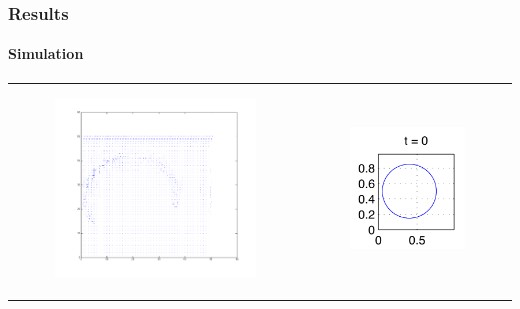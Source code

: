\documentclass[ucs]{beamer}
\begin{document}
\begin{frame}
\frametitle{Results}
\framesubtitle{Simulation}
\begin{tabular}{l l}
\begin{minipage}{0.5\textwidth}

\begin{figure}[h!]
\includegraphics[width=7cm]{plots/vel0.png}
\end{figure}
\end{minipage}
&
\begin{minipage}{0.5\textwidth}
\begin{figure}[h!]
  \includegraphics[width=4cm]{plots/interface_t0.png}
\end{figure}
\end{minipage}
\end{tabular}
\end{frame}
\end{document}

